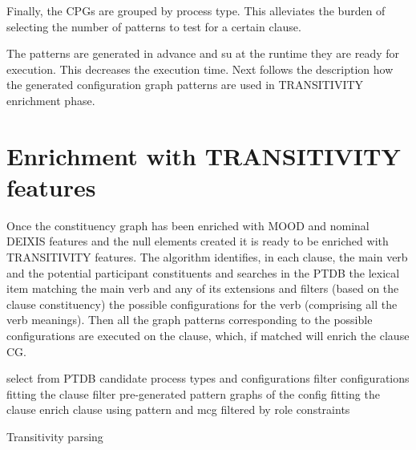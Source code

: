 Finally, the CPGs are grouped by process type. This alleviates the burden of selecting the number of patterns to test for a certain clause. 


The patterns are generated in advance and su at the runtime they are ready for execution. This decreases the execution time. Next follows the description how the generated configuration graph patterns are used in TRANSITIVITY enrichment phase.

\section{Enrichment with TRANSITIVITY features}
\label{sec:semantic-parsing}

Once the constituency graph has been enriched with MOOD and nominal DEIXIS features and the null elements created it is ready to be enriched with TRANSITIVITY features. The algorithm identifies, in each clause, the main verb and the potential participant constituents and searches in the PTDB the lexical item matching the main verb and any of its extensions and filters (based on the clause constituency) the possible configurations for the verb (comprising all the verb meanings). Then all the graph patterns corresponding to the possible configurations are executed on the clause, which, if matched will enrich the clause CG. 

\begin{algorithm}[!ht]
    \Input { \cg, \dg }
    \Begin
    {
        {
            select from PTDB candidate process types and configurations\;
            filter configurations fitting the clause \;
            {
                filter pre-generated pattern graphs of the config fitting the clause\;
                {
                    \label{line:enrich-from-pattern} enrich clause using pattern and mcg filtered by role constraints\;
                }
            }
        }
    }
    \caption{Transitivity parsing}
    \label{alg:transitivity-parsing}
\end{algorithm}

